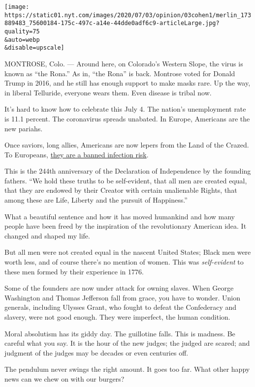 \texttt{[image: https://static01.nyt.com/images/2020/07/03/opinion/03cohen1/merlin\_173889483\_75600184-175c-497c-a14e-44dde0adf6c9-articleLarge.jpg?quality=75\\\&auto=webp\\\&disable=upscale]}

MONTROSE, Colo. --- Around here, on Colorado's Western Slope, the virus
is known as ``the Rona.'' As in, ``the Rona'' is back. Montrose voted
for Donald Trump in 2016, and he still has enough support to make masks
rare. Up the way, in liberal Telluride, everyone wears them. Even
disease is tribal now.

It's hard to know how to celebrate this July 4. The nation's
unemployment rate is 11.1 percent. The coronavirus spreads unabated. In
Europe, Americans are the new pariahs.

Once saviors, long allies, Americans are now lepers from the Land of the
Crazed. To Europeans,
\href{https://www.nytimes.com/2020/06/26/world/europe/europe-us-travel-ban.html}{they
are a banned infection risk}.

This is the 244th anniversary of the Declaration of Independence by the
founding fathers. ``We hold these truths to be self-evident, that all
men are created equal, that they are endowed by their Creator with
certain unalienable Rights, that among these are Life, Liberty and the
pursuit of Happiness.''

What a beautiful sentence and how it has moved humankind and how many
people have been freed by the inspiration of the revolutionary American
idea. It changed and shaped my life.

But all men were not created equal in the nascent United States; Black
men were worth less, and of course there's no mention of women. This was
\emph{self-evident} to these men formed by their experience in 1776.

Some of the founders are now under attack for owning slaves. When George
Washington and Thomas Jefferson fall from grace, you have to wonder.
Union generals, including Ulysses Grant, who fought to defeat the
Confederacy and slavery, were not good enough. They were imperfect, the
human condition.

Moral absolutism has its giddy day. The guillotine falls. This is
madness. Be careful what you say. It is the hour of the new judges; the
judged are scared; and judgment of the judges may be decades or even
centuries off.

The pendulum never swings the right amount. It goes too far. What other
happy news can we chew on with our burgers?

